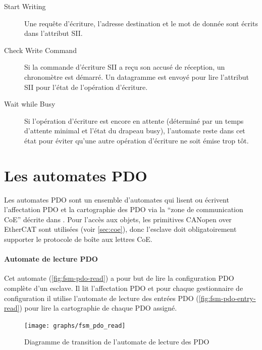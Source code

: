 \documentclass[a4paper,12pt,BCOR=6mm,bibtotoc,idxtotoc]{scrbook}
\begin{document}
\begin{description}

\item[Start Writing] Une requ\^ete d'\'ecriture, l'adresse destination
  et le mot de donn\'ee sont \'ecrits dans l'attribut SII.

\item[Check Write Command] Si la commande d'\'ecriture SII a re\c{c}u
  son accus\'e de r\'eception, un chronom\`etre est d\'emarr\'e.  Un
  datagramme est envoy\'e pour lire l'attribut SII pour l'\'etat de
  l'op\'eration d'\'ecriture.

\item[Wait while Busy] Si l'op\'eration d'\'ecriture est encore en
  attente (d\'etermin\'e par un temps d'attente minimal et l'\'etat du
  drapeau busy), l'automate reste dans cet \'etat pour \'eviter qu'une
  autre op\'eration d'\'ecriture ne soit \'emise trop t\^ot.

\end{description}


\section{Les automates PDO}
\label{sec:fsm-pdo}

Les automates PDO sont un ensemble d'automates qui lisent ou
\'ecrivent l'affectation PDO et la cartographie des PDO via la ``zone
de communication CoE'' d\'ecrite dans \cite[sec. 5.6.7.4]{alspec}.
Pour l'acc\`es aux objets, les primitives CANopen over EtherCAT sont
utilis\'ees (voir \autoref{sec:coe}), donc l'esclave doit
obligatoirement supporter le protocole de bo\^ite aux lettres CoE.

\paragraph{Automate de lecture PDO} Cet automate
(\autoref{fig:fsm-pdo-read}) a pour but de lire la configuration PDO
compl\`ete d'un esclave.  Il lit l'affectation PDO et pour chaque
gestionnaire de configuration il utilise l'automate de lecture des
entr\'ees PDO (\autoref{fig:fsm-pdo-entry-read}) pour lire la
cartographie de chaque PDO assign\'e.


\begin{figure}[htbp]
  \centering
  \texttt{[image: graphs/fsm\_pdo\_read]}
  \caption{Diagramme de transition de l'automate de lecture des PDO}
  \label{fig:fsm-pdo-read}
\end{figure}
\end{document}
